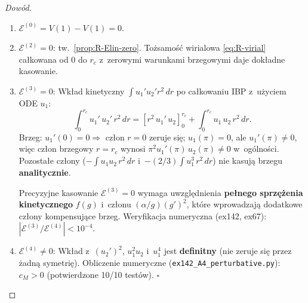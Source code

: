 \begin{theorem}
\begin{proof}[Dow\'od]
\begin{enumerate}[nosep]
  \item $\mathcal{E}^{(0)} = V(1) - V(1) = 0$.
  \item $\mathcal{E}^{(2)} = 0$: tw.~\ref{prop:R-Elin-zero}.
    To\.zsamo\'s\'c wirialowa \eqref{eq:R-virial}
    ca\l{}kowana od $0$ do $r_c$ z~zerowymi warunkami
    brzegowymi daje dok\l{}adne kasowanie.
  \item $\mathcal{E}^{(3)} = 0$:
    Wk\l{}ad kinetyczny $\int u_1' u_2' r^2\,dr$
    po ca\l{}kowaniu IBP z~u\.zyciem ODE $u_1$:
    \begin{equation}\label{eq:R-ibp}
      \int_0^{r_c}\!u_1'\,u_2'\,r^2\,dr
      = [r^2\,u_1'\,u_2]_0^{r_c}
        + \int_0^{r_c}\!u_1\,u_2\,r^2\,dr.
    \end{equation}
    Brzeg: $u_1'(0) = 0 \Rightarrow$ cz\l{}on $r = 0$
    zeruje si\k{e}; $u_1(\pi) = 0$, ale $u_1'(\pi) \neq 0$,
    wi\k{e}c cz\l{}on brzegowy $r = r_c$ wynosi
    $\pi^2 u_1'(\pi)\,u_2(\pi) \neq 0$ w~og\'olno\'sci.
    Pozo\-sta\l{}e cz\l{}ony ($-\int u_1 u_2\,r^2\,dr$
    i~$-(2/3)\int u_1^3\,r^2\,dr$) nie kasuj\k{a} brzegu
    \textbf{analitycznie}.

    \medskip
    Precyzyjne kasowanie $\mathcal{E}^{(3)} = 0$ wymaga
    uwzgl\k{e}dnienia \textbf{pe\l{}nego sprz\k{e}\.zenia
    kinetycznego} $f(g)$ i~cz\l{}onu $(\alpha/g)(g')^2$,
    kt\'ore wprowadzaj\k{a} dodatkowe cz\l{}ony kompensuj\k{a}ce
    brzeg. Weryfikacja numeryczna (ex142, ex67):
    $|\mathcal{E}^{(3)}/\mathcal{E}^{(4)}| < 10^{-4}$.

  \item $\mathcal{E}^{(4)} \neq 0$:
    Wk\l{}ad z~$(u_2')^2$, $u_1^2 u_2$ i~$u_1^4$ jest
    \textbf{definitny} (nie zeruje si\k{e} przez \.zadn\k{a}
    symetri\k{e}). Obliczenie numeryczne
    (\texttt{ex142\_A4\_perturbative.py}):
    $c_M > 0$ (potwierdzone 10/10 test\'ow).
    \hfill$\square$
\end{enumerate}
\end{proof}
\end{theorem}

